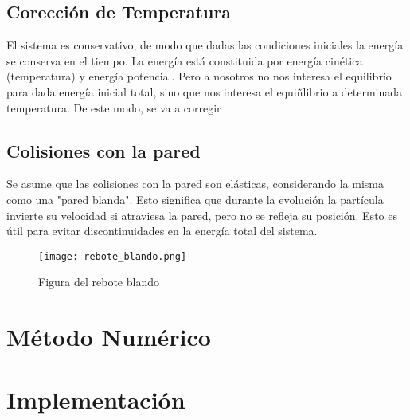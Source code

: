\documentclass[aps,prb,twocolumn,superscriptaddress,floatfix,longbibliography]{revtex4-2}
\newif\ifptitle
\newif\ifpnumber
\newcounter{para}
\newcommand\ptitle[1]{\par\refstepcounter{para}
{\ifpnumber{\noindent\textcolor{lightgray}{\textbf{\thepara}}\indent}\fi}
{\ifptitle{\textbf{[{#1}]}}\fi}}
\begin{document}
\subsection{Corección de Temperatura}

El sistema es conservativo, de modo que dadas las condiciones iniciales la energía se conserva en el tiempo. La energía está constituida por energía cinética (temperatura) y energía potencial. Pero a nosotros no nos interesa el equilibrio para dada energía inicial total, sino que nos interesa el equiñlibrio a determinada temperatura. De este modo, se va a corregir 

\subsection{Colisiones con la pared}

Se asume que las colisiones con la pared son elásticas, considerando la misma como una "pared blanda". Esto significa que durante la evolución la partícula invierte su velocidad si atraviesa la pared, pero no se refleja su posición. Esto es útil para evitar discontinuidades en la energía total del sistema.


\begin{figure}[h]
    \texttt{[image: rebote\_blando.png]}
    \caption{Figura del rebote blando}
     \label{fig:rebote_blando}
\end{figure}

\section{Método Numérico}

\section{Implementación}


\ptitle{¿Qué pasos debe hacer nuestro código para calcular la evolución del gas de electrones?}
\end{document}
